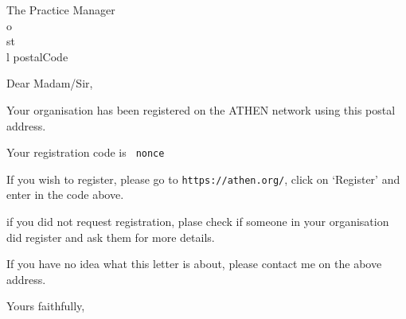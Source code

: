 \documentclass[12pt]{letter}
\begin{document}
\begin{letter}{The Practice Manager\\ {{o}} \\ {{st}} \\ {{l}} {{postalCode}} }
\opening{Dear Madam/Sir,}

Your organisation has been registered on the ATHEN network using this postal address.

Your registration code is \texttt{ {{nonce}} }

If you wish to register, please go to \texttt{https://athen.org/}, click on `Register' and enter in the code above.

if you did not request registration, plase check if someone in your organisation did register and ask them for more details.

If you have no idea what this letter is about, please contact me on the above address.

\closing{Yours faithfully,}


\end{letter}
\end{document}
